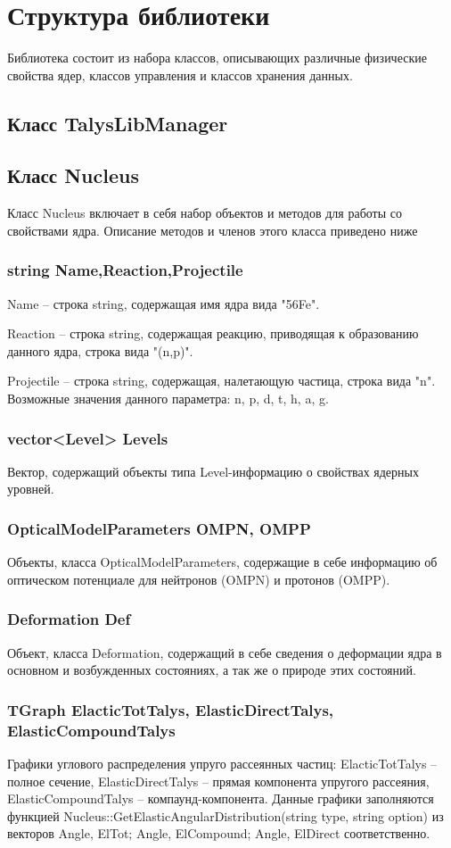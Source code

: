 \documentclass[a4paper,12pt]{extarticle}
\begin{document}
\section{Структура библиотеки}
Библиотека состоит из набора классов, описывающих различные физические свойства ядер, классов управления и классов хранения данных. 
\subsection{Класс TalysLibManager}

\subsection{Класс Nucleus}
Класс Nucleus включает в себя набор объектов и методов для работы со свойствами ядра. Описание методов и членов этого класса приведено ниже
\subsubsection{string Name,Reaction,Projectile}
Name -- строка string, содержащая имя ядра вида "56Fe".

Reaction -- строка string, содержащая реакцию, приводящая к образованию данного ядра, строка вида "(n,p)".

Projectile -- строка string, содержащая, налетающую частица, строка вида "n". Возможные значения данного параметра: n, p, d, t, h, a, g.
\subsubsection{vector<Level> Levels}
Вектор, содержащий объекты типа Level-информацию о свойствах ядерных уровней.
\subsubsection{OpticalModelParameters OMPN, OMPP}
Объекты, класса OpticalModelParameters, содержащие в себе информацию об оптическом потенциале для нейтронов (OMPN) и протонов (OMPP).
\subsubsection{Deformation Def}
Объект, класса Deformation, содержащий в себе сведения о деформации ядра в основном и возбужденных состояниях, а так же о природе этих состояний.
\subsubsection{TGraph ElacticTotTalys, ElasticDirectTalys, ElasticCompoundTalys}
Графики углового распределения упруго рассеянных частиц:  ElacticTotTalys -- полное сечение, ElasticDirectTalys -- прямая компонента упругого рассеяния, ElasticCompoundTalys -- компаунд-компонента. Данные графики заполняются функцией Nucleus::GetElasticAngularDistribution(string type, string option) из векторов Angle, ElTot; Angle, ElCompound; Angle, ElDirect соответственно.
\end{document}
